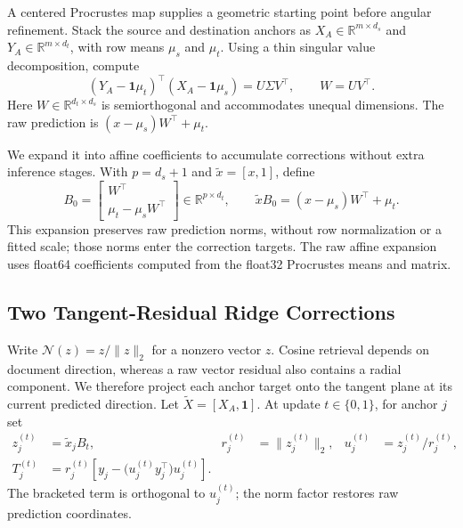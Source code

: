 A centered Procrustes map supplies a geometric starting point before angular
refinement. Stack the source and destination anchors as
$X_A\in\mathbb{R}^{m\times d_s}$ and
$Y_A\in\mathbb{R}^{m\times d_t}$, with row means $\mu_s$ and $\mu_t$.
Using a thin singular value decomposition, compute
\begin{equation}
 (Y_A-\mathbf{1}\mu_t)^\top(X_A-\mathbf{1}\mu_s)
 =U\Sigma V^\top,\qquad W=UV^\top .
 \label{eq:procrustes}
\end{equation}
Here $W\in\mathbb{R}^{d_t\times d_s}$ is semiorthogonal and accommodates unequal
dimensions. The raw prediction is
$(x-\mu_s)W^\top+\mu_t$.

We expand it into affine coefficients to accumulate corrections without extra
inference stages. With
$p=d_s+1$ and $\widetilde{x}=[x,1]$, define
\begin{equation}
 B_0=\begin{bmatrix}W^\top\\ \mu_t-\mu_sW^\top\end{bmatrix}
 \in\mathbb{R}^{p\times d_t},\qquad
 \widetilde{x}B_0=(x-\mu_s)W^\top+\mu_t .
 \label{eq:affine-init}
\end{equation}
This expansion preserves raw prediction norms, without row normalization
or a fitted scale; those norms enter the correction targets.
The raw affine expansion uses float64 coefficients computed from the
float32 Procrustes means and matrix.

\subsection{Two Tangent-Residual Ridge Corrections}
\label{sec:tangent}

Write $\mathcal N(z)=z/\|z\|_2$ for a nonzero vector $z$.
Cosine retrieval depends on document direction, whereas a raw vector residual
also contains a radial component. We therefore project each anchor target
onto the tangent plane at its current predicted direction. Let
$\widetilde{X}=[X_A,\mathbf{1}]$. At update $t\in\{0,1\}$, for anchor $j$ set
\begin{align}
 z_j^{(t)}&=\widetilde{x}_jB_t,&
 r_j^{(t)}&=\|z_j^{(t)}\|_2,&
 u_j^{(t)}&=z_j^{(t)}/r_j^{(t)},\nonumber\\
 T_j^{(t)}&=r_j^{(t)}\left[y_j-
 \bigl(u_j^{(t)}y_j^\top\bigr)u_j^{(t)}\right].
 \label{eq:tangent-target}
\end{align}
The bracketed term is orthogonal to $u_j^{(t)}$; the norm factor restores raw
prediction coordinates.

